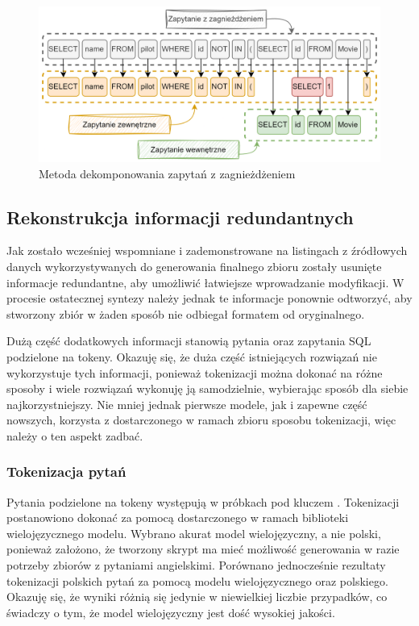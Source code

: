 \begin{figure}[ht!]
  \centering
  \includegraphics[width=1.0\linewidth]{images/query_decomposition_nested.png}
  \caption{Metoda dekomponowania zapytań z zagnieżdżeniem}
  \label{fig:query-decomposition-nested}
\end{figure}

\subsection{Rekonstrukcja informacji redundantnych}
Jak zostało wcześniej wspomniane i zademonstrowane na listingach z źródłowych danych wykorzystywanych do generowania finalnego zbioru zostały usunięte informacje redundantne, aby umożliwić łatwiejsze wprowadzanie modyfikacji. W procesie ostatecznej syntezy należy jednak te informacje ponownie odtworzyć, aby stworzony zbiór w żaden sposób nie odbiegał formatem od oryginalnego.

Dużą część dodatkowych informacji stanowią pytania oraz zapytania SQL podzielone na tokeny. Okazuję się, że duża część istniejących rozwiązań nie wykorzystuje tych informacji, ponieważ tokenizacji można dokonać na różne sposoby i wiele rozwiązań wykonuję ją samodzielnie, wybierając sposób dla siebie najkorzystniejszy. Nie mniej jednak pierwsze modele, jak i zapewne część nowszych, korzysta z dostarczonego w ramach zbioru sposobu tokenizacji, więc należy o ten aspekt zadbać.

\subsubsection{Tokenizacja pytań}
Pytania podzielone na tokeny występują w próbkach pod kluczem . Tokenizacji postanowiono dokonać za pomocą dostarczonego w ramach biblioteki  wielojęzycznego modelu. Wybrano akurat model wielojęzyczny, a nie polski, ponieważ założono, że tworzony skrypt ma mieć możliwość generowania w razie potrzeby zbiorów z pytaniami angielskimi. Porównano jednocześnie rezultaty tokenizacji polskich pytań za pomocą modelu wielojęzycznego oraz polskiego. Okazuję się, że wyniki różnią się jedynie w niewielkiej liczbie przypadków, co świadczy o tym, że model wielojęzyczny jest dość wysokiej jakości.

